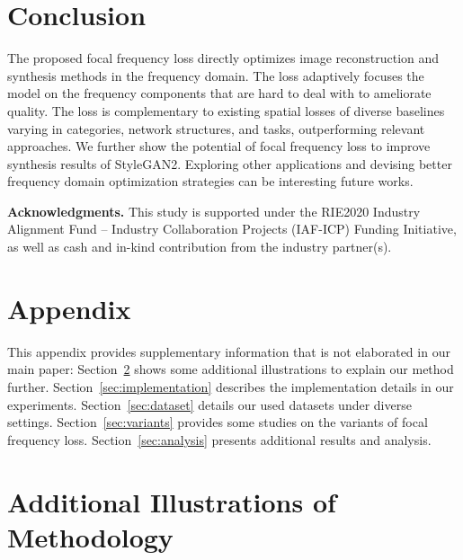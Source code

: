 \documentclass[10pt,twocolumn,letterpaper]{article}
\begin{document}
 

\section{Conclusion}
\label{sec:discussion}

The proposed focal frequency loss directly optimizes image reconstruction and synthesis methods in the frequency domain.
The loss adaptively focuses the model on the frequency components that are hard to deal with to ameliorate quality.
The loss is complementary to existing spatial losses of diverse baselines varying in categories, network structures, and tasks, outperforming relevant approaches.
We further show the potential of focal frequency loss to improve synthesis results of StyleGAN2.
Exploring other applications and devising better frequency domain optimization strategies can be interesting future works.

\vspace{0.05cm}
\noindent
\textbf{Acknowledgments.} This study is supported under the RIE2020 Industry Alignment Fund – Industry Collaboration Projects (IAF-ICP) Funding Initiative, as well as cash and in-kind contribution from the industry partner(s).
 
{\small


}



\clearpage
\section*{Appendix}
\label{sec:appendix}
This appendix provides supplementary information that is not elaborated in our main paper:
Section~\ref{sec:addimethodillus} shows some additional illustrations to explain our method further.
Section~\ref{sec:implementation} describes the implementation details in our experiments.
Section~\ref{sec:dataset} details our used datasets under diverse settings.
Section~\ref{sec:variants} provides some studies on the variants of focal frequency loss.
Section~\ref{sec:analysis} presents additional results and analysis.


\appendix
\section{Additional Illustrations of Methodology}
\label{sec:addimethodillus}
\end{document}

